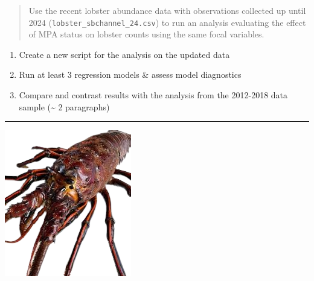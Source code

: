 \documentclass[
]{article}
\providecommand{\tightlist}{%
  \setlength{\itemsep}{0pt}\setlength{\parskip}{0pt}}
\begin{document}
\begin{quote}
Use the recent lobster abundance data with observations collected up
until 2024 (\texttt{lobster\_sbchannel\_24.csv}) to run an analysis
evaluating the effect of MPA status on lobster counts using the same
focal variables.
\end{quote}

\begin{enumerate}
\def\labelenumi{\alph{enumi}.}
\tightlist
\item
  Create a new script for the analysis on the updated data
\item
  Run at least 3 regression models \& assess model diagnostics
\item
  Compare and contrast results with the analysis from the 2012-2018 data
  sample (\textasciitilde{} 2 paragraphs)
\end{enumerate}

\begin{center}\rule{0.5\linewidth}{0.5pt}\end{center}

\includegraphics{figures/spiny1.png}
\end{document}
